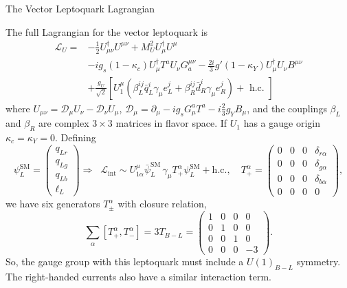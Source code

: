 \documentclass{bredelebeamer}
\begin{document}
\begin{frame}{The Vector Leptoquark Lagrangian}
	
	The full Lagrangian for the vector leptoquark is
	\begin{align*}
		\mathcal{L}_{U}=&-\frac{1}{2} U_{\mu \nu}^{\dagger} U^{\mu \nu}+M_{U}^{2} U_{\mu}^{\dagger} U^{\mu}\\&-i g_{s}\left(1-\kappa_{c}\right) U_{\mu}^{\dagger} T^{a} U_{\nu} G^{\mu \nu}_a -\frac{2 i}{3} g'\left(1-\kappa_{Y}\right) U_{\mu}^{\dagger} U_{\nu} B^{\mu \nu}\\
		&+\frac{g_{U}}{\sqrt{2}}\left[U_{1}^{\mu}\left(\beta_{L}^{i j} \bar{q}_{L}^{i} \gamma_{\mu} e_{L}^{j}+\beta_{R}^{i j} \bar{d}_{R}^{i} \gamma_{\mu} e_{R}^{j}
		\right)+\text { h.c. }\right]
	\end{align*}
	where $U_{\mu \nu}=\mathcal D_{\mu} U_{\nu}-\mathcal D_{\nu} U_{\mu}$, $\mathcal D_{\mu}=\partial_{\mu}-i g_{s} G_{\mu}^{a} T^{a}-i \frac{2}{3} g_{Y} B_{\mu}$, and the couplings $\beta_{L}$ and $\beta_{R}$ are complex $3 \times 3$ matrices in flavor space. If $U_1$ has a gauge origin $\kappa_{c}=\kappa_{Y}=0$.
	\pause
	Defining 
	$$
	\psi_{L}^{\mathrm{SM}}=\begin{pmatrix}
		q_{Lr}\\ q_{Lg}\\ q_{Lb}\\ \ell_L
	\end{pmatrix}
	\Longrightarrow\;\;
	\mathcal{L}_{\text{int}}
	\sim U_{1\alpha}^\mu \bar{\psi}_{L}^{\mathrm{SM}}\, \gamma_{\mu} T_{+}^{\alpha } \psi_{L}^{\mathrm{SM}} + \text{h.c.},
	\quad
	T_{+}^{\alpha}=\begin{pmatrix}
		0 & 0 & 0 & \delta_{r\alpha}\\
		0 & 0 & 0 & \delta_{g\alpha}\\
		0 & 0 & 0 & \delta_{b\alpha}\\
		0 & 0 & 0 & 0
	\end{pmatrix},
	$$
	we have six generators $T_{\pm}^{\alpha }$ with closure relation,
	$$
	\sum_{\alpha} \left[{T_{+}^{\alpha }},{T_{-}^{\alpha}}\right] =
	3 T_{B-L}=\begin{pmatrix}
		1 & 0 & 0 & 0\\
		0 & 1 & 0 & 0\\
		0 & 0 & 1 & 0\\
		0 & 0 & 0 & -3
	\end{pmatrix}.
	$$
	So, the gauge group with this leptoquark must include a $U(1)_{B-L}$ symmetry. The right-handed currents also have a similar interaction term.
\end{frame}
\end{document}
